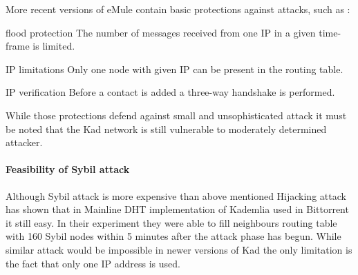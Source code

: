 More recent versions of eMule contain basic protections against attacks, such
as \cite{tim11}:
\begin{description}
  \item{flood protection} The number of messages received from one IP in a given
    time-frame is limited.
  \item{IP limitations} Only one node with given IP can be present in the
    routing table.
  \item{IP verification} Before a contact is added a three-way handshake is
    performed.
\end{description}

While those protections defend against small and unsophisticated attack it must
be noted that the Kad network is still vulnerable to moderately determined
attacker.

\paragraph{Feasibility of Sybil attack}
Although Sybil attack is more expensive than above mentioned Hijacking attack
\cite{tim11} has shown that in Mainline DHT implementation of Kademlia used in
Bittorrent it still easy. In their experiment they were able to fill neighbours
routing table with 160 Sybil nodes within 5 minutes after the attack phase has
begun. While similar attack would be impossible in newer versions of Kad the
only limitation is the fact that only one IP address is used.
